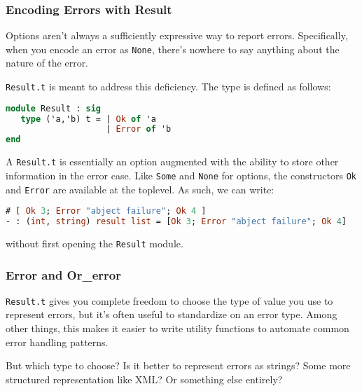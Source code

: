 \hypertarget{encoding-errors-with-result}{%
\subsubsection{Encoding Errors with
Result}\label{encoding-errors-with-result}}

Options aren't always a sufficiently expressive way to report errors.
Specifically, when you encode an error as
\passthrough{\lstinline!None!}, there's nowhere to say anything about
the nature of the error.

\passthrough{\lstinline!Result.t!} is meant to address this deficiency.
The type is defined as follows:

\begin{lstlisting}[language=Caml]
module Result : sig
   type ('a,'b) t = | Ok of 'a
                    | Error of 'b
end
\end{lstlisting}

A \passthrough{\lstinline!Result.t!} is essentially an option augmented
with the ability to store other information in the error case. Like
\passthrough{\lstinline!Some!} and \passthrough{\lstinline!None!} for
options, the constructors \passthrough{\lstinline!Ok!} and
\passthrough{\lstinline!Error!} are available at the toplevel. As such,
we can write:

\begin{lstlisting}[language=Caml]
# [ Ok 3; Error "abject failure"; Ok 4 ]
- : (int, string) result list = [Ok 3; Error "abject failure"; Ok 4]
\end{lstlisting}

without first opening the \passthrough{\lstinline!Result!} module.

\hypertarget{error-and-or_error}{%
\subsubsection{Error and Or\_error}\label{error-and-or_error}}

\passthrough{\lstinline!Result.t!} gives you complete freedom to choose
the type of value you use to represent errors, but it's often useful to
standardize on an error type. Among other things, this makes it easier
to write utility functions to automate common error handling
patterns.

But which type to choose? Is it better to represent errors as strings?
Some more structured representation like XML? Or something else
entirely?

